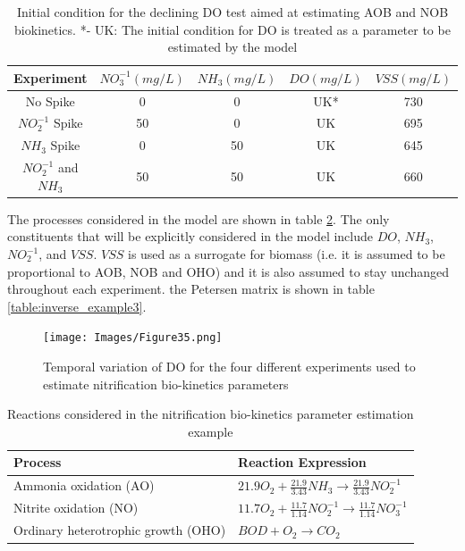 \begin{table}[]
    \centering
    \begin{tabular}{c|c c c c}
       Experiment  & $NO_3^{-1}(mg/L) $ & $NH_3(mg/L)$ & $DO(mg/L)$ & $VSS(mg/L)$ \\
    \hline
        No Spike & 0 & 0 & UK* &  730  \\
        $NO_2^{-1}$ Spike & 50 & 0 & UK & 695 \\
        $NH_3$ Spike & 0 & 50 & UK & 645 \\
        $NO_2^{-1}$ and $NH_3$ & 50 & 50 & UK & 660\\ 
    \end{tabular}
    \caption{Initial condition for the declining DO test aimed at estimating AOB and NOB biokinetics. *- UK: The initial condition for DO is treated as a parameter to be estimated by the model}
    \label{table:inverse_example}
\end{table}

The processes considered in the model are shown in table \ref{table:inverse_example2}. The only constituents that will be explicitly considered in the model include $DO$, $NH_3$, $NO_2^{-1}$, and $VSS$. $VSS$ is used as a surrogate for biomass (i.e. it is assumed to be proportional to AOB, NOB and OHO) and it is also assumed to stay unchanged throughout each experiment. the Petersen matrix is shown in table \ref{table:inverse_example3}.

\begin{figure}[!ht]
\begin{center}
\texttt{[image: Images/Figure35.png]} \\
\caption{Temporal variation of DO for the four different experiments used to estimate nitrification bio-kinetics parameters}\label{fig:inverse_example1}
\end{center}
\end{figure}

\begin{table}[]
    \centering
    \begin{tabular}{l l}
       Process & Reaction Expression \\
    \hline
        Ammonia oxidation (AO) & $21.9O_2 + \frac{21.9}{3.43}NH_3 \rightarrow \frac{21.9}{3.43}NO_2^{-1}$  \\
        Nitrite oxidation (NO) & $11.7O_2 + \frac{11.7}{1.14}NO_2^{-1} \rightarrow \frac{11.7}{1.14}NO_3^{-1}$ \\
        Ordinary heterotrophic growth (OHO) & $BOD + O_2 \rightarrow CO_2$ \\
    \end{tabular}
    \caption{Reactions considered in the nitrification bio-kinetics parameter estimation example}
    \label{table:inverse_example2}
\end{table}


